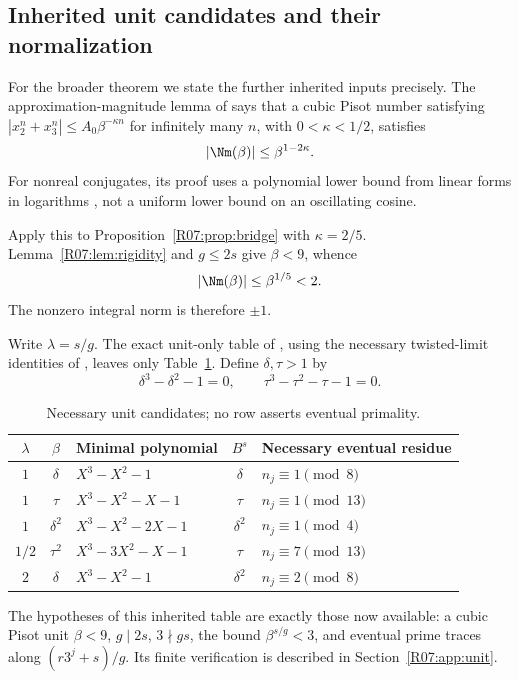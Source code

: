 \documentclass[11pt,a4paper]{article}
\theoremstyle{definition}\newtheorem{definition}[theorem]{Definition}
\theoremstyle{remark}\newtheorem{remark}[theorem]{Remark}
\begin{document}
\subsection{Inherited unit candidates and their normalization}

For the broader theorem we state the further inherited inputs precisely.
The approximation-magnitude lemma of \cite{K064} says that a cubic
Pisot number satisfying
$|x_2^n+x_3^n|\le A_0\beta^{-\kappa n}$ for infinitely many $n$,
with $0<\kappa<1/2$, satisfies
\begin{equation}\label{R07:eq:magnitude}
                       |\Nm(\beta)|\le\beta^{1-2\kappa}.
\end{equation}
For nonreal conjugates, its proof uses a polynomial lower bound from
linear forms in logarithms \cite{BW}, not a uniform lower bound on
an oscillating cosine.

Apply this to Proposition~\ref{R07:prop:bridge} with $\kappa=2/5$.
Lemma~\ref{R07:lem:rigidity} and $g\le2s$ give $\beta<9$, whence
\[
                     |\Nm(\beta)|\le\beta^{1/5}<2.
\]
The nonzero integral norm is therefore $\pm1$.

Write $\lambda=s/g$. The exact unit-only table of \cite{P01},
using the necessary twisted-limit identities of \cite{K064}, leaves
only Table~\ref{R07:tab:units}. Define $\delta,\tau>1$ by
\[
        \delta^3-\delta^2-1=0,\qquad
        \tau^3-\tau^2-\tau-1=0.
\]

\begin{table}[htbp]
\centering\small
\begin{tabular}{cclcl}
\toprule
$\lambda$ & $\beta$ & Minimal polynomial & $B^s$ & Necessary eventual residue\\
\midrule
$1$ & $\delta$ & $X^3-X^2-1$ & $\delta$ & $n_j\equiv1\pmod8$\\
$1$ & $\tau$ & $X^3-X^2-X-1$ & $\tau$ & $n_j\equiv1\pmod{13}$\\
$1$ & $\delta^2$ & $X^3-X^2-2X-1$ & $\delta^2$ & $n_j\equiv1\pmod4$\\
$1/2$ & $\tau^2$ & $X^3-3X^2-X-1$ & $\tau$ & $n_j\equiv7\pmod{13}$\\
$2$ & $\delta$ & $X^3-X^2-1$ & $\delta^2$ & $n_j\equiv2\pmod8$\\
\bottomrule
\end{tabular}
\caption{Necessary unit candidates; no row asserts eventual primality.}
\label{R07:tab:units}
\end{table}

The hypotheses of this inherited table are exactly those now available:
a cubic Pisot unit $\beta<9$, $g\mid2s$, $3\nmid gs$, the bound
$\beta^{s/g}<3$, and eventual prime traces along $(r3^j+s)/g$.
Its finite verification is described in Section~\ref{R07:app:unit}.
\end{document}

